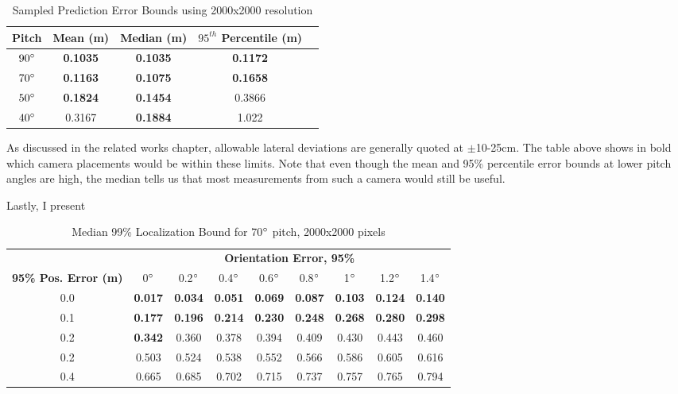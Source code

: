 \documentclass[a4paper,12pt,twoside,openright]{report}
\begin{document}
\begin{table}[htb]
    \centering
    \caption{Sampled Prediction Error Bounds using 2000x2000 resolution}
    \label{tab:camera:best error bounds}
    \begin{tabular}{@{}ccccc@{}}
        \toprule 
        \textbf{Pitch}       & \textbf{Mean (m)}   & \textbf{Median (m)} & \textbf{$95^{th}$ Percentile (m)} &  \\ \midrule 
        $90\degree$ & \textbf{0.1035} & \textbf{0.1035} & \textbf{0.1172}           &  \\ 
        $70\degree$ & \textbf{0.1163} & \textbf{0.1075} & \textbf{0.1658}           &  \\
        $50\degree$ & \textbf{0.1824} & \textbf{0.1454} & 0.3866           &  \\
        $40\degree$ & 0.3167 & \textbf{0.1884} & 1.022            &  \\ \midrule
    \end{tabular}
\end{table}


As discussed in the related works chapter, allowable lateral deviations are generally
quoted at $\pm$10-25cm. The table above shows in bold which camera placements would be 
within these limits. Note that even though the mean and 95\% percentile error bounds
at lower pitch angles are high, the median tells us that most measurements
from such a camera would still be useful.

Lastly, I present

\begin{table}[htb]
\centering
\caption{Median 99\% Localization Bound for 70$\degree$ pitch, 2000x2000 pixels}
\label{tab:camera:70deg}

\begin{tabular}{ccccccccc}
\toprule
& \multicolumn{8}{c}{\textbf{Orientation Error, 95\%}} \\
\cmidrule(ll){2-9}
\multicolumn{1}{N}{\textbf{95\% Pos. Error (m)}} & 0$\degree$& 0.2$\degree$& 0.4$\degree$ & 0.6$\degree$ & 0.8$\degree$ & 1$\degree$ & 1.2$\degree$ & 1.4$\degree$\\
\cmidrule(lr){1-1}
\cmidrule(ll){2-9}
0.0 & \textbf{0.017} & \textbf{0.034} & \textbf{0.051} & \textbf{0.069} & \textbf{0.087} & \textbf{0.103} & \textbf{0.124} & \textbf{0.140} \\
0.1 & \textbf{0.177} & \textbf{0.196} & \textbf{0.214} & \textbf{0.230} & \textbf{0.248} & \textbf{0.268} & \textbf{0.280} & \textbf{0.298 } \\
0.2 & \textbf{0.342} & 0.360 & 0.378 & 0.394 & 0.409 & 0.430 & 0.443 & 0.460  \\
0.2 & 0.503 & 0.524 & 0.538 & 0.552 & 0.566 & 0.586 & 0.605 & 0.616  \\
0.4 & 0.665 & 0.685 & 0.702 & 0.715 & 0.737 & 0.757 & 0.765 & 0.794  \\
\end{tabular} 
\end{table}
\end{document}
